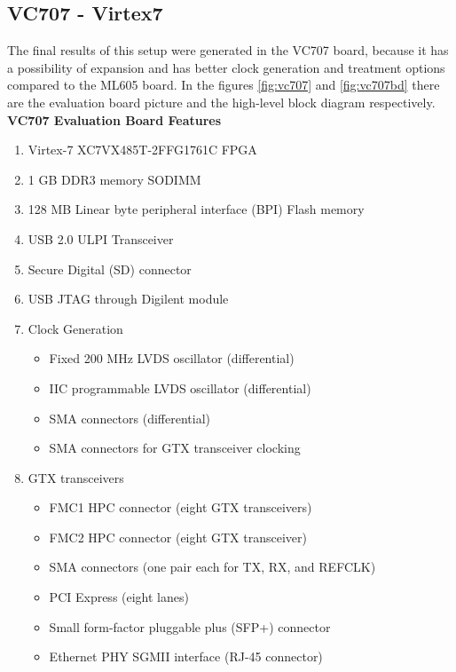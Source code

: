 \subsection{VC707 - Virtex7}

The final results of this setup were generated in the VC707 board, because it
has a possibility of expansion and has better clock generation and treatment
options compared to the ML605 board. In the figures \ref{fig:vc707} and
\ref{fig:vc707bd} there are the evaluation board picture and the high-level block
diagram respectively.\\

\textbf{VC707 Evaluation Board Features}

\begin{enumerate}

  \item Virtex-7 XC7VX485T-2FFG1761C FPGA
  \item 1 GB DDR3 memory SODIMM
  \item 128 MB Linear byte peripheral interface (BPI) Flash memory
  \item USB 2.0 ULPI Transceiver
  \item Secure Digital (SD) connector
  \item USB JTAG through Digilent module
  \item Clock Generation

  \begin{itemize}
    \item Fixed 200 MHz LVDS oscillator (differential)
    \item IIC programmable LVDS oscillator (differential)
    \item SMA connectors (differential)
    \item SMA connectors for GTX transceiver clocking
  \end{itemize}

  \item GTX transceivers

  \begin{itemize}
    \item FMC1 HPC connector (eight GTX transceivers)
    \item FMC2 HPC connector (eight GTX transceiver)
    \item SMA connectors (one pair each for TX, RX, and REFCLK)
    \item PCI Express (eight lanes)
    \item Small form-factor pluggable plus (SFP+) connector
    \item Ethernet PHY SGMII interface (RJ-45 connector)
  \end{itemize}


\end{enumerate}
